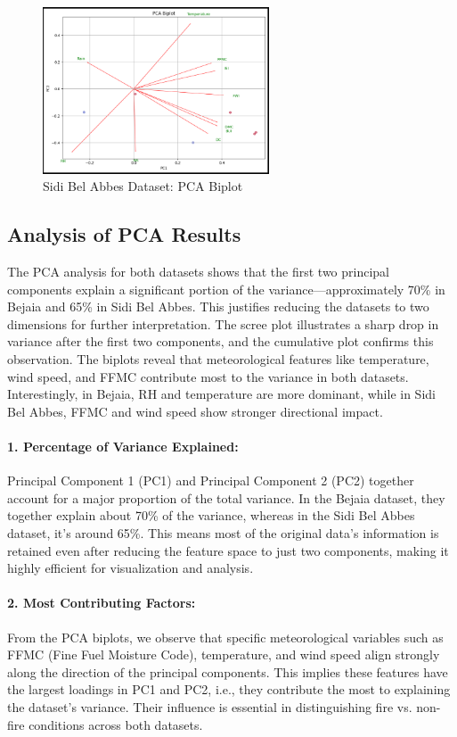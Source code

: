 \documentclass[12pt]{article}
\begin{document}
\begin{figure}[h!]
  \centering
  \includegraphics[width=0.6\textwidth]{images/svd_pca_lda/biplot_2.png}
  \caption{Sidi Bel Abbes Dataset: PCA Biplot}
\end{figure}

\subsection*{Analysis of PCA Results}

The PCA analysis for both datasets shows that the first two principal components explain a significant portion of the variance—approximately 70\% in Bejaia and 65\% in Sidi Bel Abbes. This justifies reducing the datasets to two dimensions for further interpretation. The scree plot illustrates a sharp drop in variance after the first two components, and the cumulative plot confirms this observation. The biplots reveal that meteorological features like temperature, wind speed, and FFMC contribute most to the variance in both datasets. Interestingly, in Bejaia, RH and temperature are more dominant, while in Sidi Bel Abbes, FFMC and wind speed show stronger directional impact.

\paragraph{1. Percentage of Variance Explained:}  
Principal Component 1 (PC1) and Principal Component 2 (PC2) together account for a major proportion of the total variance. In the Bejaia dataset, they together explain about 70\% of the variance, whereas in the Sidi Bel Abbes dataset, it's around 65\%. This means most of the original data’s information is retained even after reducing the feature space to just two components, making it highly efficient for visualization and analysis.

\paragraph{2. Most Contributing Factors:}  
From the PCA biplots, we observe that specific meteorological variables such as FFMC (Fine Fuel Moisture Code), temperature, and wind speed align strongly along the direction of the principal components. This implies these features have the largest loadings in PC1 and PC2, i.e., they contribute the most to explaining the dataset's variance. Their influence is essential in distinguishing fire vs. non-fire conditions across both datasets.
\end{document}
